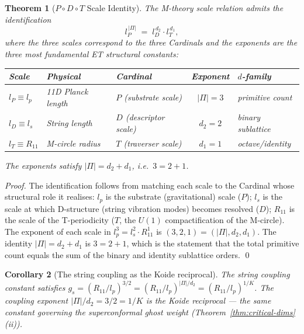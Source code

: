 \documentclass[11pt,a4paper]{article}
\newtheorem{theorem}{Theorem}[section]
\newtheorem{corollary}[theorem]{Corollary}
\theoremstyle{definition}
\theoremstyle{remark}
\begin{document}
\begin{theorem}[$P \circ D \circ T$ Scale Identity]\label{thm:pdt-scale}
The M-theory scale relation admits the identification
\[
\boxed{\;l_{P}^{\,|\Pi|} \;=\; l_{D}^{\,d_{2}} \cdot l_{T}^{\,d_{1}},\;}
\]
where the three scales correspond to the three Cardinals and the exponents are the three most fundamental ET structural constants:
\begin{center}
\begin{tabular}{@{}l l l c l@{}}
\toprule
Scale & Physical & Cardinal & Exponent & $d$-family \\
\midrule
$l_{P} \equiv l_{p}$ & 11D Planck length & $P$ (substrate scale) & $|\Pi| = 3$ & primitive count \\
$l_{D} \equiv l_{s}$ & String length & $D$ (descriptor scale) & $d_{2} = 2$ & binary sublattice \\
$l_{T} \equiv R_{11}$ & M-circle radius & $T$ (traverser scale) & $d_{1} = 1$ & octave/identity \\
\bottomrule
\end{tabular}
\end{center}
The exponents satisfy $|\Pi| = d_{2} + d_{1}$, i.e.\ $3 = 2 + 1$.
\end{theorem}

\begin{proof}
The identification follows from matching each scale to the Cardinal whose structural role it realises: $l_{p}$ is the substrate (gravitational) scale ($P$); $l_{s}$ is the scale at which D-structure (string vibration modes) becomes resolved ($D$); $R_{11}$ is the scale of the T-periodicity ($T$, the $U(1)$ compactification of the M-circle). The exponent of each scale in $l_{p}^{3} = l_{s}^{2} \cdot R_{11}^{1}$ is $(3,2,1) = (|\Pi|, d_{2}, d_{1})$. The identity $|\Pi| = d_{2} + d_{1}$ is $3 = 2 + 1$, which is the statement that the total primitive count equals the sum of the binary and identity sublattice orders. \qed
\end{proof}

\begin{corollary}[The string coupling as the Koide reciprocal]\label{cor:string-coupling}
The string coupling constant satisfies $g_{s} = (R_{11}/l_{p})^{3/2} = (R_{11}/l_{p})^{|\Pi|/d_{2}} = (R_{11}/l_{p})^{1/K}$. The coupling exponent $|\Pi|/d_{2} = 3/2 = 1/K$ is the Koide reciprocal --- the same constant governing the superconformal ghost weight (Theorem~\ref{thm:critical-dims}(ii)).
\end{corollary}
\end{document}

